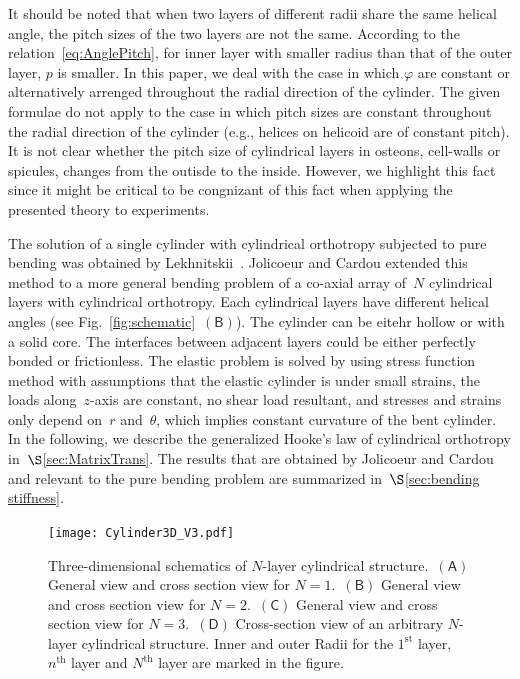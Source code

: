 \documentclass[preprint,10pt,times]{elsarticle}
\numberwithin{equation}{section}
\newcommand{\pr}[1]{\left( #1 \right)}
\newcommand{\subf}[1]{\pr{\textsf{#1}}}
\renewcommand{\>}{$\Rightarrow$}
\begin{document}
It should be noted that when two layers of different radii share the same helical angle, the pitch sizes of the two layers are not the same. According to the relation~\eqref{eq:AnglePitch}, for inner layer with smaller radius than that of the outer layer, $p$ is smaller. In this paper, we deal with the case in which $\varphi$ are constant or alternatively arrenged throughout the radial direction of the cylinder. The given formulae do not apply to the case in which pitch sizes are constant throughout the radial direction of the cylinder (e.g., helices on helicoid are of constant pitch). It is not clear whether the pitch size of cylindrical layers in osteons, cell-walls or spicules, changes from the outisde to the inside. However, we highlight this fact since it might be critical to be congnizant of this fact when applying the presented theory to experiments. 

The solution of a single cylinder with cylindrical orthotropy subjected to pure bending was obtained by Lekhnitskii~\cite{Lekhnitskii1981}. Jolicoeur and Cardou extended this method to a more general bending problem of a co-axial array of~$N$ cylindrical layers with cylindrical orthotropy. Each cylindrical layers have different helical angles (see Fig.~\ref{fig:schematic}~$\subf{B}$). The cylinder can be eitehr hollow or with a solid core. The interfaces between adjacent layers could be either perfectly bonded or frictionless. The elastic problem is solved by using stress function method with assumptions that the elastic cylinder is under small strains, the loads along~$z$-axis are constant, no shear load resultant, and stresses and strains only depend on~$r$ and~$\theta$, which implies constant curvature of the bent cylinder. In the following, we describe the generalized Hooke's law of cylindrical orthotropy in~$\S$\ref{sec:MatrixTrans}. The results that are obtained by Jolicoeur and Cardou and relevant to the pure bending problem are summarized in~$\S$\ref{sec:bending stiffness}.


\begin{figure}[t]
  \centering
  \graphicspath{{../LyxFiles/figure/}}
   \texttt{[image: Cylinder3D\_V3.pdf]}
  \caption{Three-dimensional schematics of  $N$-layer cylindrical structure.~$\subf{A}$ General view and cross section view for $N = 1$.~$\subf{B}$ General view and cross section view for $N = 2$.~$\subf{C}$ General view and cross section view for $N = 3$.~$\subf{D}$ Cross-section view of an arbitrary $N$-layer cylindrical structure. Inner and outer Radii for the $1^\text{st}$ layer, $n^\text{th}$ layer and $N^\text{th}$ layer are marked in the figure.}
  \label{fig:Cylinder3D}
\end{figure}
\end{document}
